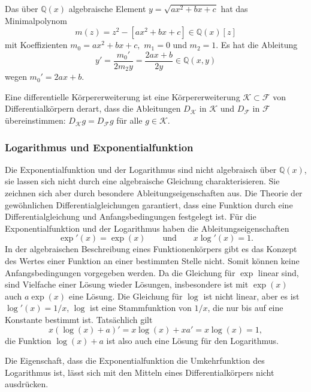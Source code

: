 \begin{beispiel}
Das über $\mathbb{Q}(x)$ algebraische Element $y=\sqrt{ax^2+bx+c}$
hat das Minimalpolynom
\[
m(z)
=
z^2 - [ax^2+bx+c]
\in
\mathbb{Q}(x)[z]
\]
mit Koeffizienten $m_0 = ax^2+bx+c,$ $m_1=0$ und $m_2=1$.
Es hat die Ableitung
\[
y'
= 
\frac{m_0'}{2m_2y}
=
\frac{
2ax+b
}{
2y
}
\in
\mathbb{Q}(x,y)
\]
wegen $m_0'=2ax+b$.
\end{beispiel}

\begin{definition}
Eine differentielle Körpererweiterung ist eine Körpererweiterung
$\mathscr{K}\subset\mathscr{F}$ von Differentialkörpern derart, dass
die Ableitungen $D_{\mathscr{K}}$ in $\mathscr{K}$
und $D_{\mathscr{F}}$ in $\mathscr{F}$ übereinstimmen:
\(
D_{\mathscr{K}}g= D_{\mathscr{F}} g
\)
für alle $g\in\mathscr{K}$.
\end{definition}

%
%
\subsubsection{Logarithmus und Exponentialfunktion}
Die Exponentialfunktion und der Logarithmus sind nicht algebraisch
über $\mathbb{Q}(x)$, sie lassen sich nicht durch eine algebraische
Gleichung charakterisieren.
Sie zeichnen sich aber durch besondere Ableitungseigenschaften aus.
Die Theorie der gewöhnlichen Differentialgleichungen garantiert,
dass eine Funktion durch eine Differentialgleichung und Anfangsbedingungen
festgelegt ist.
\label{buch:integral:expundlog}
Für die Exponentialfunktion und der Logarithmus haben die 
Ableitungseigenschaften
\[
\exp'(x) = \exp(x)
\qquad\text{und}\qquad
x \log'(x) = 1.
\]
%
%
In der algebraischen Beschreibung eines Funktionenkörpers gibt es
das Konzept des Wertes einer Funktion an einer bestimmten Stelle nicht.
Somit können keine Anfangsbedingungen vorgegeben werden.
Da die Gleichung für $\exp$ linear sind, sind Vielfache einer Lösung wieder
Lösungen,
insbesondere ist mit $\exp(x)$ auch $a\exp(x)$ eine Lösung.
Die Gleichung für $\log$ ist nicht linear, aber es ist
$\log'(x) = 1/x$, $\log$ ist eine Stammfunktion von $1/x$, die
nur bis auf eine Konstante bestimmt ist.
Tatsächlich gilt
\[
x(\log(x)+a)'
=
x\log(x) + xa' = x\log(x)=1,
\]
die Funktion $\log(x)+a$ ist also auch eine Lösung für den Logarithmus.

Die Eigenschaft, dass die Exponentialfunktion die Umkehrfunktion
des Logarithmus ist, lässt sich mit den Mitteln eines Differentialkörpers
nicht ausdrücken.

